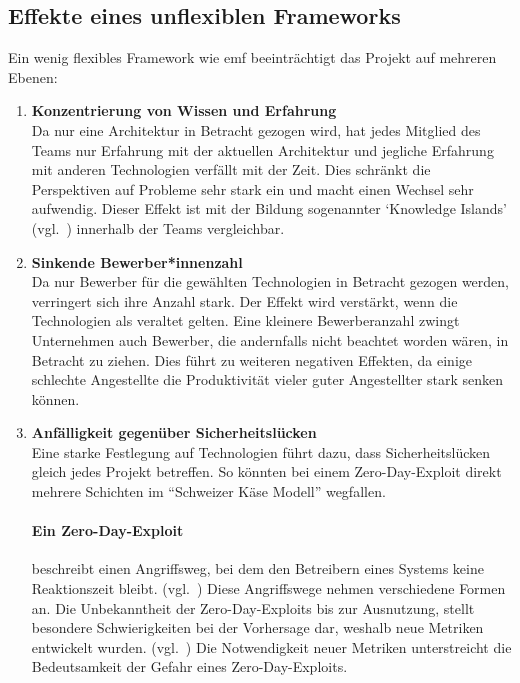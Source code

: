 \documentclass[./einleitung.tex]{subfiles}
\begin{document}
\subsection{Effekte eines unflexiblen Frameworks}\label{subsec:effekte-eines-unflexiblen-frameworks}
Ein wenig flexibles Framework wie \acrshort{emf} beeinträchtigt das Projekt auf mehreren Ebenen:
\begin{enumerate}
\item \textbf{Konzentrierung von Wissen und Erfahrung} \\
Da nur eine Architektur in Betracht gezogen wird, hat jedes Mitglied des Teams nur Erfahrung mit der aktuellen Architektur und jegliche Erfahrung mit anderen Technologien verfällt mit der Zeit.
Dies schränkt die Perspektiven auf Probleme sehr stark ein und macht einen Wechsel sehr aufwendig.
Dieser Effekt ist mit der Bildung sogenannter `Knowledge Islands' (vgl.~\cite{cury2024knowledge}) innerhalb der Teams vergleichbar.
\item \textbf{Sinkende Bewerber*innenzahl} \\
Da nur Bewerber für die gewählten Technologien in Betracht gezogen werden, verringert sich ihre Anzahl stark.
Der Effekt wird verstärkt, wenn die Technologien als veraltet gelten.
Eine kleinere Bewerberanzahl zwingt Unternehmen auch Bewerber, die andernfalls nicht beachtet worden wären, in Betracht zu ziehen.
Dies führt zu weiteren negativen Effekten, da einige schlechte Angestellte die Produktivität vieler guter Angestellter stark senken können.
\item \textbf{Anfälligkeit gegenüber Sicherheitslücken} \\
Eine starke Festlegung auf Technologien führt dazu, dass Sicherheitslücken gleich jedes Projekt betreffen.
So könnten bei einem Zero-Day-Exploit direkt mehrere Schichten im ``Schweizer Käse Modell'' wegfallen.
\begin{center}
    \paragraph{Ein Zero-Day-Exploit} beschreibt einen Angriffsweg, bei dem den Betreibern eines Systems keine Reaktionszeit bleibt. (vgl.~\cite{ibmZeroDay})
    Diese Angriffswege nehmen verschiedene Formen an.
    Die Unbekanntheit der Zero-Day-Exploits bis zur Ausnutzung, stellt besondere Schwierigkeiten bei der Vorhersage dar, weshalb neue Metriken entwickelt wurden. (vgl.~\cite{wang2013k})
    Die Notwendigkeit neuer Metriken unterstreicht die Bedeutsamkeit der Gefahr eines Zero-Day-Exploits.
\end{center}
\begin{center}

\end{center}
\end{enumerate}
\end{document}
